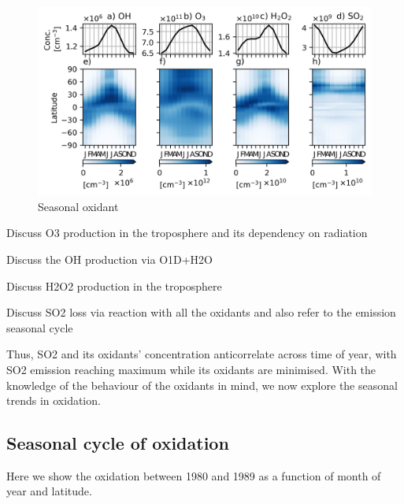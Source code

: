 \begin{figure}
    \centering
    \includegraphics[width=\linewidth]{Chapter4/Figs/seasonal_oxidant_1980.png}
    \caption{Seasonal oxidant}
    \label{fig:ch4:seasonal-oxidants}
\end{figure}

Discuss O3 production in the troposphere and its dependency on radiation

Discuss the OH production via O1D+H2O

Discuss H2O2 production in the troposphere

Discuss SO2 loss via reaction with all the oxidants and also refer to the emission seasonal cycle

Thus, SO2 and its oxidants' concentration anticorrelate across time of year, with SO2 emission reaching maximum while its oxidants are minimised. With the knowledge of the behaviour of the oxidants in mind, we now explore the seasonal trends in oxidation.

\subsection{Seasonal cycle of oxidation}

Here we show the  oxidation between 1980 and 1989 as a function of month of year and latitude.

